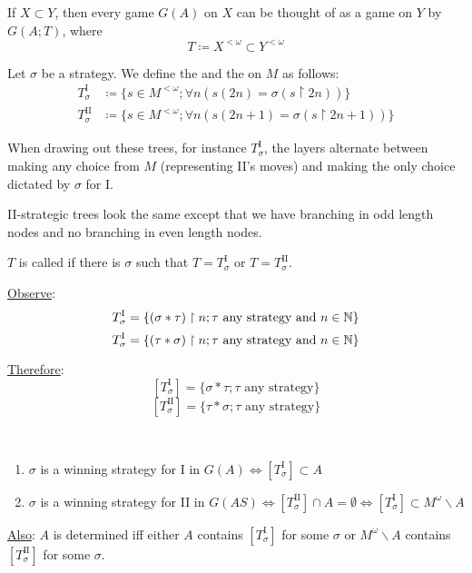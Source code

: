 \documentclass[]{article}
\newcommand{\I}{\textrm{I}}
\newcommand{\II}{\textrm{II}}
\newcommand{\om}{\omega}
\newcommand{\lom}{{<\omega}}
\begin{document}
\begin{remark}[Example 3]
    If $X\subset Y$, then every game $G(A)$ on $X$ can be thought of as a game on $Y$ by $G(A;T)$, where $$T\coloneqq X^{\lom} \subset Y^{\lom}$$
\end{remark}

\begin{defin*}
    Let $\sigma$ be a strategy. We define the  and the  on $M$ as follows:
    \begin{align*}
        T_\sigma^\I &\coloneqq \{s\in M^{\lom}; \forall n(s(2n)=\sigma(s\restriction 2n))\}\\
        T_\sigma^\II &\coloneqq \{s\in M^\lom; \forall n(s(2n+1)=\sigma(s\restriction 2n+1))\}
    \end{align*}

    When drawing out these trees, for instance $T_\sigma^\I$, the layers alternate between making any choice from $M$ (representing II's moves) and making the only choice dictated by $\sigma$ for I.

    II-strategic trees look the same except that we have branching in odd length nodes and no branching in even length nodes.

    $T$ is called  if there is $\sigma$ such that $T = T^\I_\sigma$ or $T = T^\II_\sigma$.
\end{defin*}

\underline{Observe}: $$T_\sigma^\I = \{(\sigma\ast \tau)\restriction n; \tau \textrm{ any strategy and }n\in \N\}$$ $$T_\sigma^\I = \{(\tau\ast \sigma)\restriction n; \tau \textrm{ any strategy and }n\in \N\}$$

\underline{Therefore}: $$ [T_\sigma^\I] = \{\sigma\ast \tau; \tau \textrm{ any strategy}\}$$
$$ [T_\sigma^\II] = \{\tau\ast\sigma; \tau \textrm{ any strategy}\}$$

\begin{remark}[Proposition]\ 
    \begin{enumerate}
        \item $\sigma$ is a winning strategy for I in $G(A)\iff [T_\sigma^\I]\subset A$
        \item $\sigma$ is a winning strategy for II in $G(AS)\iff [T_\sigma^\II]\cap A = \emptyset \iff [T_\sigma^\I]\subset M^\omega \backslash A$
    \end{enumerate}

    \underline{Also}: $A$ is determined iff either $A$ contains $[T_\sigma^\I]$ for some $\sigma$ or $M^\om \backslash A$ contains $[T_\sigma^\II]$ for some $\sigma$.
\end{remark}
\end{document}
